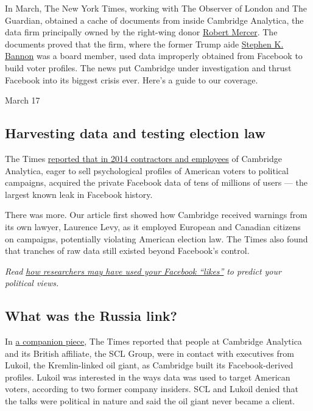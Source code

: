 In March, The New York Times, working with The Observer of London and
The Guardian, obtained a cache of documents from inside Cambridge
Analytica, the data firm principally owned by the right-wing donor
\href{https://www.nytimes.com/2016/08/19/us/politics/robert-mercer-donald-trump-donor.html}{Robert
Mercer}. The documents proved that the firm, where the former Trump aide
\href{https://www.nytimes.com/2017/03/31/business/dealbook/how-some-top-trump-aides-made-their-fortunes.html}{Stephen
K. Bannon} was a board member, used data improperly obtained from
Facebook to build voter profiles. The news put Cambridge under
investigation and thrust Facebook into its biggest crisis ever. Here's a
guide to our coverage.

March 17

\hypertarget{harvesting-data-and-testing-election-law}{%
\subsection{Harvesting data and testing election
law}\label{harvesting-data-and-testing-election-law}}

The Times
\href{https://www.nytimes.com/2018/03/17/us/politics/cambridge-analytica-trump-campaign.html}{reported
that in 2014 contractors and employees} of Cambridge Analytica, eager to
sell psychological profiles of American voters to political campaigns,
acquired the private Facebook data of tens of millions of users --- the
largest known leak in Facebook history.

There was more. Our article first showed how Cambridge received warnings
from its own lawyer, Laurence Levy, as it employed European and Canadian
citizens on campaigns, potentially violating American election law. The
Times also found that tranches of raw data still existed beyond
Facebook's control.

\emph{Read}
\href{https://www.nytimes.com/2018/03/20/technology/facebook-cambridge-behavior-model.html}{\emph{how
researchers may have used your Facebook ``likes''}} \emph{to predict
your political views.}

\hypertarget{what-was-the-russia-link}{%
\subsection{What was the Russia link?}\label{what-was-the-russia-link}}

In
\href{https://www.nytimes.com/2018/03/17/us/politics/cambridge-analytica-russia.html}{a
companion piece}, The Times reported that people at Cambridge Analytica
and its British affiliate, the SCL Group, were in contact with
executives from Lukoil, the Kremlin-linked oil giant, as Cambridge built
its Facebook-derived profiles. Lukoil was interested in the ways data
was used to target American voters, according to two former company
insiders. SCL and Lukoil denied that the talks were political in nature
and said the oil giant never became a client.

